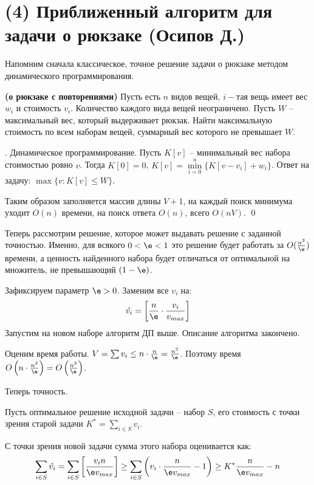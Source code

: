 \section{(4) Приближенный алгоритм для задачи о рюкзаке (Осипов Д.)} 
Напомним сначала классическое, точное решение задачи о рюкзаке методом динамического программирования.

\begin{problem*}{\bfseries (о рюкзаке с повторениями)}
	Пусть есть $n$ видов вещей, $i-$тая вещь имеет вес $w_i$ и стоимость $v_i$. Количество каждого вида вещей неограничено. Пусть $W$ -- максимальный вес, который выдерживает рюкзак. Найти максимальную стоимость по всем наборам вещей, суммарный вес которого не превышает $W$.
\end{problem*}

. Динамическое программирование. Пусть $K[v]$ -- минимальный вес набора стоимостью ровно $v$. Тогда $K[0] = 0$, $K[v] = \underset{i=0}{\overset{n}{\min}} \{K[v-v_i] + w_i\}$. Ответ на задачу: $\max\{v : K[v] \leq W\}$. 

Таким образом заполняется массив длины $V+1$, на каждый поиск минимума уходит $O(n)$ времени, на поиск ответа $O(n)$, всего $O(nV)$.  \qed

Теперь рассмотрим решение, которое может выдавать решение с заданной точностью. Именно, для всякого $0 < \e < 1$ это решение будет работать за $O(\frac{n^3}{\e})$ времени, а ценность найденного набора будет отличаться от оптимальной на множитель, не превышающий $(1-\e)$.


Зафиксируем параметр $\e>0$. Заменим все $v_i$ на: $$\hat{v_i} = \left[\frac{n}{\e} \cdot \frac{v_i}{v_{max}}\right]$$ Запустим на новом наборе алгоритм ДП выше. Описание алгоритма закончено.

Оценим время работы. $V = \sum v_i \leq n\cdot \frac{n}{\e} = \frac{n^2}{\e}$. Поэтому время $O\left(n \cdot \frac{n^2}{\e}\right) = O\left(\frac{n^3}{\e}\right)$.

Теперь точность. 

Пусть оптимальное решение исходной задачи -- набор $S$, его стоимость с точки зрения старой задачи $K^* = \sum\limits_{i\in S} v_i$.

С точки зрения новой задачи сумма этого набора оценивается как: 
$$\sum_{i\in S}\hat{v_i} = \sum_{i\in S} \left[\frac{v_i n}{\e v_{max}}\right] \geq \sum_{i\in S} \left(v_i \cdot \frac{n}{\e v_{max}} - 1\right) \geq K^*\frac{n}{\e v_{max}} - n$$


